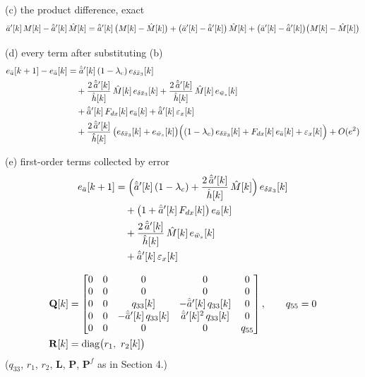 \noindent (c) the product difference, exact
\[
\bar{a}'[k]\,M[k] - \hat{\bar{a}}'[k]\,\hat{M}[k]
= \hat{\bar{a}}'[k]\,\big(M[k] - \hat{M}[k]\big) + \big(\bar{a}'[k] - \hat{\bar{a}}'[k]\big)\,\hat{M}[k] + \big(\bar{a}'[k] - \hat{\bar{a}}'[k]\big)\big(M[k] - \hat{M}[k]\big)
\]

\noindent (d) every term after substituting (b)
\[
\begin{aligned}
e_{\bar{a}}[k+1] - e_{\bar{a}}[k]
&= \hat{\bar{a}}'[k]\,(1-\lambda_c)\,e_{\delta\bar{x}_3}[k] \\
&\quad + \frac{2\,\hat{\bar{a}}'[k]}{\hat{h}[k]}\,\hat{M}[k]\,e_{\delta\bar{x}_3}[k] + \frac{2\,\hat{\bar{a}}'[k]}{\hat{h}[k]}\,\hat{M}[k]\,e_{\bar{w}_s}[k] \\
&\quad + \hat{\bar{a}}'[k]\,F_{dx}[k]\,e_{\bar{a}}[k] + \hat{\bar{a}}'[k]\,\varepsilon_x[k] \\
&\quad + \frac{2\,\hat{\bar{a}}'[k]}{\hat{h}[k]}\,\big(e_{\delta\bar{x}_3}[k] + e_{\bar{w}_s}[k]\big)\Big((1-\lambda_c)\,e_{\delta\bar{x}_3}[k] + F_{dx}[k]\,e_{\bar{a}}[k] + \varepsilon_x[k]\Big) + O(e^{2})
\end{aligned}
\]

\noindent (e) first-order terms collected by error
\[
\begin{aligned}
e_{\bar{a}}[k+1] &= \Big(\hat{\bar{a}}'[k]\,(1-\lambda_c) + \frac{2\,\hat{\bar{a}}'[k]}{\hat{h}[k]}\,\hat{M}[k]\Big)\,e_{\delta\bar{x}_3}[k] \\
&\quad + \big(1 + \hat{\bar{a}}'[k]\,F_{dx}[k]\big)\,e_{\bar{a}}[k] \\
&\quad + \frac{2\,\hat{\bar{a}}'[k]}{\hat{h}[k]}\,\hat{M}[k]\,e_{\bar{w}_s}[k] \\
&\quad + \hat{\bar{a}}'[k]\,\varepsilon_x[k]
\end{aligned}
\]

\[
\begin{aligned}
\mathbf{Q}[k] &=
\begin{bmatrix}
0 & 0 & 0 & 0 & 0 \\
0 & 0 & 0 & 0 & 0 \\
0 & 0 & q_{33}[k] & -\hat{\bar{a}}'[k]\,q_{33}[k] & 0 \\
0 & 0 & -\hat{\bar{a}}'[k]\,q_{33}[k] & \hat{\bar{a}}'[k]^{2}\,q_{33}[k] & 0 \\
0 & 0 & 0 & 0 & q_{55}
\end{bmatrix},
\qquad q_{55} = 0 \\
\mathbf{R}[k] &= \mathrm{diag}\big(r_1,\ r_2[k]\big)
\end{aligned}
\]
($q_{33}$, $r_1$, $r_2$, $\mathbf{L}$, $\mathbf{P}$, $\mathbf{P}^f$ as in Section 4.)

